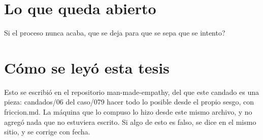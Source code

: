 \documentclass[11pt,a4paper]{article}
\begin{document}
\section{Lo que queda abierto}
\textquestiondown{}Si el proceso nunca acaba, que se deja para que se sepa que se intento?

\section*{Cómo se leyó esta tesis}
Esto se escribió en el repositorio man-made-empathy, del que este candado es una pieza: candados/06 del caso/079 hacer todo lo posible desde el propio sesgo, con friccion.md. La máquina que lo compuso lo hizo desde este mismo archivo, y no agregó nada que no estuviera escrito. Si algo de esto es falso, se dice en el mismo sitio, y se corrige con fecha.
\end{document}
